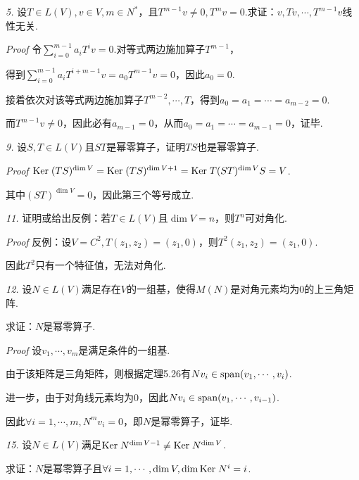 \hspace*{\fill}

\textit{5.}
设\(T \in L(V),v \in V,m \in N^*\)，且\(T^{m-1}v \ne 0,T^m v=0\).求证：\(v,Tv,\cdots,T^{m-1}v\)线性无关.

\textit{Proof}
令\(\sum_{i=0}^{m-1} a_iT^i v=0\).对等式两边施加算子\(T^{m-1}\)，

得到\(\sum_{i=0}^{m-1} a_iT^{i+m-1} v=a_0T^{m-1} v=0\)，因此\(a_0=0\).

接着依次对该等式两边施加算子\(T^{m-2},\cdots,T\)，得到\(a_0=a_1=\cdots=a_{m-2}=0\).

而\(T^{m-1}v \ne 0\)，因此必有\(a_{m-1}=0\)，从而\(a_0=a_1=\cdots=a_{m-1}=0\)，证毕.

\hspace*{\fill}

\textit{9.}
设\(S,T \in L(V)\)且\(ST\)是幂零算子，证明\(TS\)也是幂零算子.

\textit{Proof}
\(\mathrm{Ker \;} (TS)^{\dim V}=\mathrm{Ker \;} (TS)^{\dim V+1}=\mathrm{Ker \;} T(ST)^{\dim V}S=V\).

其中\((ST)^{\dim V}=0\)，因此第三个等号成立.

\hspace*{\fill}

\textit{11.}
证明或给出反例：若\(T \in L(V)\)且\(\dim V=n\)，则\(T^n\)可对角化.

\textit{Proof}
反例：设\(V=C^2,T(z_1,z_2)=(z_1,0)\)，则\(T^2(z_1,z_2)=(z_1,0)\).

因此\(T^2\)只有一个特征值，无法对角化.

\newpage

\textit{12.}
设\(N \in L(V)\)满足存在\(V\)的一组基，使得\(M(N)\)是对角元素均为\(0\)的上三角矩阵.

求证：\(N\)是幂零算子.

\textit{Proof}
设\(v_1,\cdots,v_m\)是满足条件的一组基.

由于该矩阵是三角矩阵，则根据定理5.26有\(Nv_i \in \mathrm{span} (v_1,\cdots,v_i)\).

进一步，由于对角线元素均为\(0\)，因此\(Nv_i \in \mathrm{span} (v_1,\cdots,v_{i-1})\).

因此\(\forall i=1,\cdots,m,N^m v_i=0\)，即\(N\)是幂零算子，证毕.

\hspace*{\fill}

\textit{15.}
设\(N \in L(V)\)满足\(\mathrm{Ker \;} N^{\dim V-1} \ne \mathrm{Ker \;} N^{\dim V}\).

求证：\(N\)是幂零算子且\(\forall i=1,\cdots,\dim V,\dim \mathrm{Ker \;} N^i=i\).

